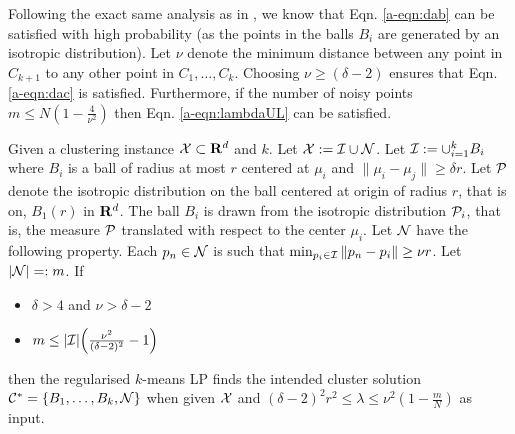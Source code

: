 Following the exact same analysis as in \cite{awasthi2015relax}, we know that Eqn. \ref{a-eqn:dab} can be satisfied with high probability (as the points in the balls $B_i$ are generated by an isotropic distribution).   Let $\nu$ denote the minimum distance between any point in $C_{k+1}$ to any other point in $C_1, \ldots, C_k$. Choosing $\nu \ge (\delta-2)$ ensures that Eqn. \ref{a-eqn:dac} is satisfied. Furthermore, if the number of noisy points $m \le N (1-\frac{4}{\nu^2})$ then Eqn. \ref{a-eqn:lambdaUL} can be satisfied.

\begin{theorem}
\label{a-theorem:lptight}
Given a clustering instance $\mathcal X \subset \mathbf R^d$ and $k$. Let $\mathcal X : = \mathcal I \cup \mathcal N$. Let $\mathcal I := \cup_{i=1}^k B_i$ where $B_i$ is a ball of radius at most $r$ centered at $\mu_i$ and $\|\mu_i - \mu_j\| \ge \delta r$. Let $\mathcal P$ denote the isotropic distribution on the ball centered at origin of radius $r$, that is on, $B_1(r)$ in $\mathbf R^d$. The ball $B_i$ is drawn from the isotropic distribution $\mathcal P_i$, that is, the measure $\mathcal P$ translated with respect to the center $\mu_i$.  Let $\mathcal N$ have the following property. Each $p_n \in \mathcal N$ is such that $\min_{p_i \in \mathcal I} \|p_n - p_i\| \ge \nu r$. Let $|\mathcal N| =: m$. If

\begin{itemize}
  \item $\delta > 4$ and $\nu > \delta - 2$ 
  \item $m \le |\mathcal I|\Big(\frac{\nu^2}{(\delta-2)^2}-1\Big)$
\end{itemize}
then the regularised $k$-means LP finds the intended cluster solution  $\mathcal C^* = \{B_1, \ldots, B_k, \mathcal N\}$ when given $\mathcal X$ and $(\delta - 2)^2r^2 \le \lambda \le \nu^2(1-\frac{m}{N})$ as input.
\end{theorem}


